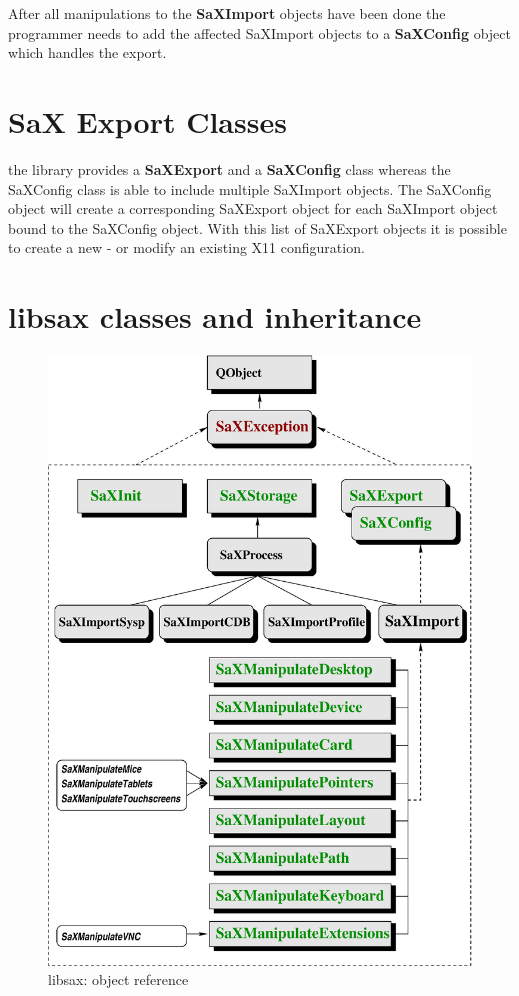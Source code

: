 After all manipulations to the \textbf{SaXImport} objects have been done
the programmer needs to add the affected SaXImport objects to a
\textbf{SaXConfig} object which handles the export. 

\section{SaX Export Classes}
the library provides a \textbf{SaXExport} and a \textbf{SaXConfig} class
whereas the SaXConfig class is able to include multiple SaXImport objects.
The SaXConfig object will create a corresponding SaXExport object for each
SaXImport object bound to the SaXConfig object. With this list of SaXExport
objects it is possible to create a new - or modify an existing X11
configuration.

\section{libsax classes and inheritance}
\begin{figure}[h]
\centering
\includegraphics[scale=0.6]{figures/tree.eps}
\caption{libsax: object reference}
\end{figure}
